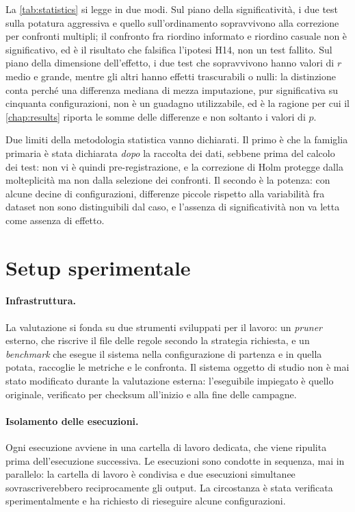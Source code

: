 La \autoref{tab:statistics} si legge in due modi. Sul piano della significatività, i due test
sulla potatura aggressiva e quello sull'ordinamento sopravvivono alla correzione per confronti
multipli; il confronto fra riordino informato e riordino casuale non è significativo, ed è il
risultato che falsifica l'ipotesi H14, non un test fallito. Sul piano della dimensione
dell'effetto, i due test che sopravvivono hanno valori di $r$ medio e grande, mentre gli altri
hanno effetti trascurabili o nulli: la distinzione conta perché una differenza mediana di mezza
imputazione, pur significativa su cinquanta configurazioni, non è un guadagno utilizzabile, ed è
la ragione per cui il \autoref{chap:results} riporta le somme delle differenze e non soltanto i
valori di $p$.

Due limiti della metodologia statistica vanno dichiarati. Il primo è che la famiglia primaria è
stata dichiarata \emph{dopo} la raccolta dei dati, sebbene prima del calcolo dei test: non vi è
quindi pre-registrazione, e la correzione di Holm protegge dalla molteplicità ma non dalla
selezione dei confronti. Il secondo è la potenza: con alcune decine di configurazioni, differenze
piccole rispetto alla variabilità fra dataset non sono distinguibili dal caso, e l'assenza di
significatività non va letta come assenza di effetto.

\section{Setup sperimentale}\label{sec:setup}

\paragraph{Infrastruttura.} La valutazione si fonda su due strumenti sviluppati per il lavoro: un
\emph{pruner} esterno, che riscrive il file delle regole secondo la strategia richiesta, e un
\emph{benchmark} che esegue il sistema nella configurazione di partenza e in quella potata,
raccoglie le metriche e le confronta. Il sistema oggetto di studio non è mai stato modificato
durante la valutazione esterna: l'eseguibile impiegato è quello originale, verificato per
checksum all'inizio e alla fine delle campagne.

\paragraph{Isolamento delle esecuzioni.} Ogni esecuzione avviene in una cartella di lavoro
dedicata, che viene ripulita prima dell'esecuzione successiva. Le esecuzioni sono condotte in
sequenza, mai in parallelo: la cartella di lavoro è condivisa e due esecuzioni simultanee
sovrascriverebbero reciprocamente gli output. La circostanza è stata verificata sperimentalmente
e ha richiesto di rieseguire alcune configurazioni.

